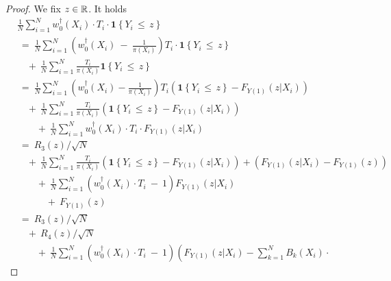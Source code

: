 \begin{proof}
  We fix $z\in\mathbb{R}$.
  It holds
  \begin{align*}
    &
    \frac{1}{N}
    \sum_{i=1}^{N} 
    w_0^\dagger(X_i)
    \cdot
    T_i
    \cdot
    \mathbf{1}{\left\{ Y_i\, \le\, z \right\}}
    \\
    &
    \ 
    =
    \ 
    \frac{1}{N}
    \sum_{i=1}^{N} 
    \left( 
    w_0^\dagger(X_i)
    \ 
    -
    \ 
    \frac{1}{\pi(X_i)}
    \right)
    T_i
    \cdot
    \mathbf{1}{\left\{ Y_i\, \le\, z \right\}}
    \\
    &
    \quad 
    +
    \ 
    \frac{1}{N}
    \sum_{i=1}^{N} 
    \frac{T_i}{\pi(X_i)}
    \mathbf{1}{\left\{ Y_i\, \le\, z \right\}}
    \\
    &
    \ 
    =
    \ 
    \frac{1}{N}
    \sum_{i=1}^{N} 
    \left( 
    w_0^\dagger(X_i)
    -
    \frac{1}{\pi(X_i)}
    \right)
    T_i
    \left( 
    \mathbf{1}{\left\{ Y_i\, \le\, z \right\}}
    -
    F_{Y(1)}(z|X_i)
    \right)
    \\
    &
    \quad 
    +
    \ 
    \frac{1}{N}
    \sum_{i=1}^{N} 
    \frac{T_i}{\pi(X_i)}
    \left( 
    \mathbf{1}{\left\{ Y_i\, \le\, z \right\}}
    -
    F_{Y(1)}(z|X_i)
    \right)
    \\
    &
    \qquad 
    +
    \ 
    \frac{1}{N}
    \sum_{i=1}^{N} 
    w_0^\dagger(X_i)\cdot T_i\cdot
    F_{Y(1)}(z|X_i)
    \\
    &
    \ 
    =
    \ 
    R_3(z)
    /\sqrt{N}
    \\
    &
    \quad 
    +
    \ 
    \frac{1}{N}
    \sum_{i=1}^{N} 
    \frac{T_i}{\pi(X_i)}
    \left( 
    \mathbf{1}{\left\{ Y_i\, \le\, z \right\}}
    -
    F_{Y(1)}(z|X_i)
    \right)
    +
    \left( 
    F_{Y(1)}(z|X_i)
    -
    F_{Y(1)}(z)
    \right)
    \\
    &
    \qquad
    +
    \ 
    \frac{1}{N}
    \sum_{i=1}^{N} 
    \left( 
    w_0^\dagger(X_i)\cdot T_i
    \ 
    -
    \ 
    1
    \right)
    F_{Y(1)}(z|X_i)
    \\
    &
    \quad\qquad
    +
    \ 
    F_{Y(1)}(z)
    \\
    &
    \ 
    =
    \ 
    R_3(z)
    /\sqrt{N}
    \\
    &
    \quad
    +
    \ 
    R_4(z)/\sqrt{N}
    \\
    &
    \qquad
    +
    \ 
    \frac{1}{N}
    \sum_{i=1}^{N} 
    \left( 
    w_0^\dagger(X_i)\cdot T_i
    \ 
    -
    \ 
    1
    \right)
    \left( 
    F_{Y(1)}(z|X_i)
    -
    \sum_{k=1}^{N} 
    B_k(X_i)
    \cdot

\end{align*}
\end{proof}
